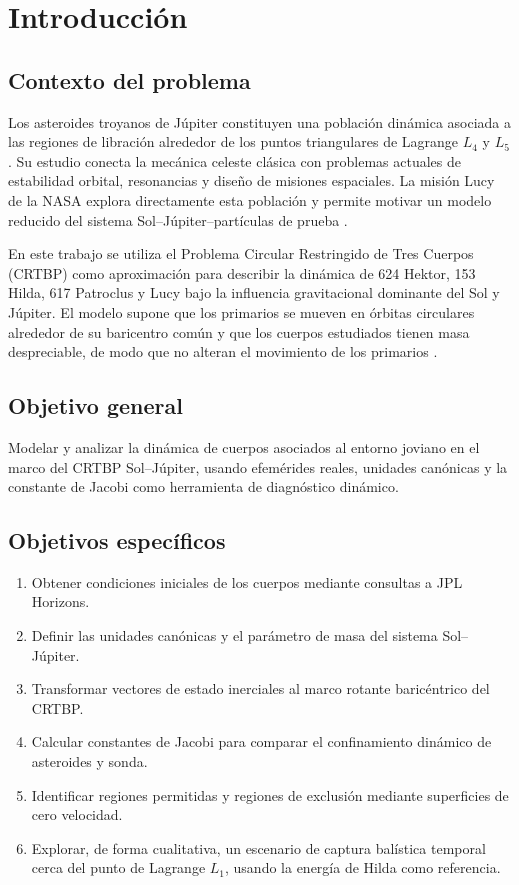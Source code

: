 \documentclass[12pt,a4paper]{article}
\begin{document}
\newpage
\tableofcontents
\newpage

\section{Introducción}
\subsection{Contexto del problema}
\noindent
Los asteroides troyanos de Júpiter constituyen una población dinámica asociada a las regiones de libración alrededor de los puntos triangulares de Lagrange \(L_4\) y \(L_5\). Su estudio conecta la mecánica celeste clásica con problemas actuales de estabilidad orbital, resonancias y diseño de misiones espaciales. La misión Lucy de la NASA explora directamente esta población y permite motivar un modelo reducido del sistema Sol--Júpiter--partículas de prueba \cite{nasa_lucy,murray1999solar}.

En este trabajo se utiliza el Problema Circular Restringido de Tres Cuerpos (CRTBP) como aproximación para describir la dinámica de 624 Hektor, 153 Hilda, 617 Patroclus y Lucy bajo la influencia gravitacional dominante del Sol y Júpiter. El modelo supone que los primarios se mueven en órbitas circulares alrededor de su baricentro común y que los cuerpos estudiados tienen masa despreciable, de modo que no alteran el movimiento de los primarios \cite{szebehely1967,zuluaga_mecanica_celeste}.

\subsection{Objetivo general}
Modelar y analizar la dinámica de cuerpos asociados al entorno joviano en el marco del CRTBP Sol--Júpiter, usando efemérides reales, unidades canónicas y la constante de Jacobi como herramienta de diagnóstico dinámico.

\subsection{Objetivos específicos}
\begin{enumerate}[label=\alph*)]
  \item Obtener condiciones iniciales de los cuerpos mediante consultas a JPL Horizons.
  \item Definir las unidades canónicas y el parámetro de masa del sistema Sol--Júpiter.
  \item Transformar vectores de estado inerciales al marco rotante baricéntrico del CRTBP.
  \item Calcular constantes de Jacobi para comparar el confinamiento dinámico de asteroides y sonda.
  \item Identificar regiones permitidas y regiones de exclusión mediante superficies de cero velocidad.
  \item Explorar, de forma cualitativa, un escenario de captura balística temporal cerca del punto de Lagrange \(L_1\), usando la energía de Hilda como referencia.
\end{enumerate}
\end{document}
